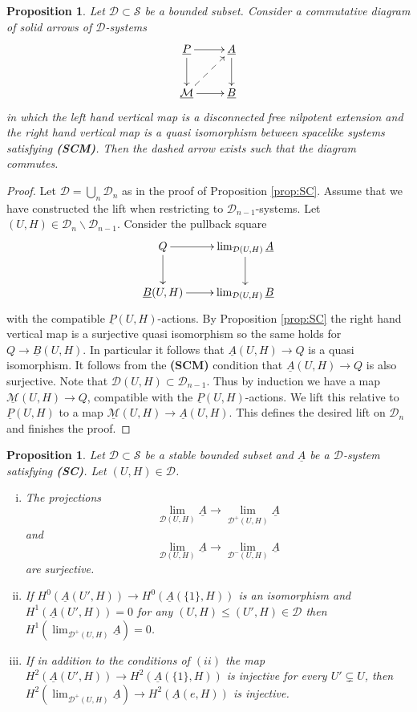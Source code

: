 \documentclass[12pt,a4paper]{article}
\newtheorem{prop}[thm]{Proposition}
\theoremstyle{definition}
\begin{document}
\begin{prop}\label{prop:lifting}
Let $\mathcal{D}\subset \mathcal{S}$ be a bounded subset.
Consider a commutative diagram of solid arrows of $\mathcal{D}$-systems
\[\xymatrix{
\underline{P}\ar[d]\ar[r] & \underline{A}\ar[d]\\
\underline{\mathcal{M}}\ar[r]\ar@{-->}[ur]& \underline{B}
}\]
in which the left hand vertical map is a disconnected free nilpotent extension and the right hand vertical map is a quasi isomorphism between spacelike systems satisfying \textbf{(SCM)}. Then the dashed arrow exists such that the diagram commutes.
\end{prop}

\begin{proof}
Let $\mathcal{D}=\bigcup_n \mathcal{D}_n$ as in the proof of Proposition \ref{prop:SC}. Assume that we have constructed the lift when restricting to $\mathcal{D}_{n-1}$-systems. Let $(U,H)\in \mathcal{D}_n\backslash \mathcal{D}_{n-1}$.  Consider the pullback square
\[\xymatrix{
Q\ar[r]\ar[d]&\lim_{\mathcal{D}(U,H)} \underline{A}\ar[d]\\
\underline{B}(U,H)\ar[r]& \lim_{\mathcal{D}(U,H)}\underline{B}
}\]
with the compatible $\underline{P}(U,H)$-actions. By Proposition \ref{prop:SC} the right hand vertical map is a surjective quasi isomorphism so the same holds for $Q\rightarrow \underline{B}(U,H)$. In particular it follows that $\underline{A}(U,H)\rightarrow Q$ is a quasi isomorphism. It follows from the \textbf{(SCM)} condition that $\underline{A}(U,H)\rightarrow Q$ is also surjective. Note that $\mathcal{D}(U,H)\subset \mathcal{D}_{n-1}$. Thus by induction we have a map $\underline{\mathcal{M}}(U,H)\rightarrow Q$, compatible with the $\underline{P}(U,H)$-actions. We lift this relative to $\underline{P}(U,H)$ to a map $\underline{\mathcal{M}}(U,H)\rightarrow \underline{A}(U,H)$. This defines the desired lift on $\mathcal{D}_n$ and finishes the proof.
\end{proof}

\begin{prop}\label{prop:technicaldiagramstuff}
Let $\mathcal{D}\subset \mathcal{S}$ be a stable bounded subset and $\underline{A}$ be a $\mathcal{D}$-system satisfying \textbf{(SC)}. Let $(U,H)\in \mathcal{D}$.
\begin{enumerate}[(i)]
\item The projections
\[\lim_{\mathcal{D}(U,H)}\underline A\longrightarrow \lim_{\mathcal{D}^+(U,H)}\underline{A}\]
and
\[\lim_{\mathcal{D}(U,H)}\underline A\longrightarrow \lim_{\mathcal{D}^-(U,H)}\underline{A}\]
are surjective.
\item
If $H^0(\underline{A}(U',H))\rightarrow H^0(\underline{A}(\{1\},H))$ is an isomorphism and $H^1(\underline{A}(U',H))=0$ for any $(U,H)\leq (U',H)\in \mathcal{D}$ then $H^1(\lim_{\mathcal{D}^+(U,H)}\underline{A})=0$. 
\item
If in addition to the conditions of $(ii)$ the map $H^2(\underline{A}(U',H))\rightarrow H^2(\underline{A}(\{1\},H))$ is injective for every $U'\subsetneq U$, then $H^2(\lim_{\mathcal{D}^+(U,H)}\underline{A})\rightarrow H^2(\underline{A}(e,H))$ is injective.
\end{enumerate}
\end{prop}
\end{document}
